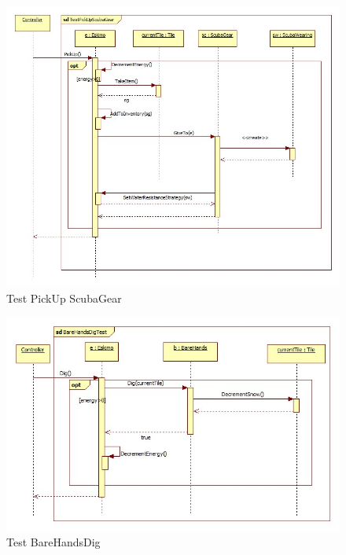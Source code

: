 \begin{figure}[H]
	\begin{center}
		\includegraphics[width=17cm]{chapters/chapter05/diagrams/TestPickUpScubaGear.jpg}
		\caption{Test PickUp ScubaGear}
		\label{fig:Test PickUp ScubaGear}
	\end{center}
\end{figure}

\begin{figure}[H]
	\begin{center}
		\includegraphics[width=15cm]{chapters/chapter05/diagrams/TestBareHandsDig.jpg}
		\caption{Test BareHandsDig}
		\label{fig:Test BareHandsDig}
	\end{center}
\end{figure}

